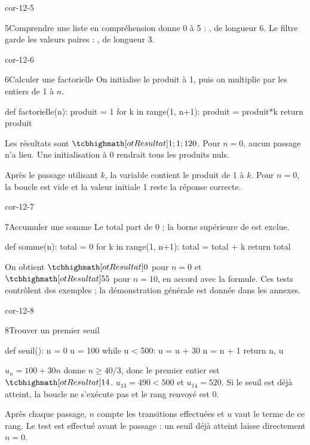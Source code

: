\begin{blocLivre}{cor-12-5}
\begin{corrige}{5}{Comprendre une liste en compréhension}
 donne 0 à 5 : , de longueur 6. Le filtre garde les valeurs paires : , de longueur 3.
\end{corrige}
\end{blocLivre}
\begin{blocLivre}{cor-12-6}
\begin{corrige}{6}{Calculer une factorielle}
On initialise le produit à 1, puis on multiplie par les entiers de 1 à $n$.
\begin{python}
def factorielle(n):
    produit = 1
    for k in range(1, n+1):
        produit = produit*k
    return produit
\end{python}
Les résultats sont $\res{1;1;120}$. Pour $n=0$, aucun passage n'a lieu.
Une initialisation à 0 rendrait tous les produits nuls.

Après le passage utilisant $k$, la variable contient le produit de 1 à $k$. Pour $n=0$, la boucle est vide et la valeur initiale 1 reste la réponse correcte.

\end{corrige}
\end{blocLivre}
\begin{blocLivre}{cor-12-7}
\begin{corrige}{7}{Accumuler une somme}
Le total part de 0 ; la borne supérieure de  est exclue.
\begin{python}
def somme(n):
    total = 0
    for k in range(1, n+1):
        total = total + k
    return total
\end{python}
On obtient $\res{0}$ pour $n=0$ et $\res{55}$ pour $n=10$, en accord avec la formule.
Ces tests contrôlent des exemples ; la démonstration générale est donnée dans les annexes.
\end{corrige}
\end{blocLivre}
\begin{blocLivre}{cor-12-8}
\begin{corrige}{8}{Trouver un premier seuil}
\begin{python}
def seuil():
    n = 0
    u = 100
    while u < 500:
        u = u + 30
        n = n + 1
    return n, u
\end{python}
$u_n=100+30n$ donne $n\geq40/3$, donc le premier entier est $\res{14}$.
$u_{13}=490<500$ et $u_{14}=520$. Si le seuil est déjà atteint, la boucle ne s'exécute pas et le rang renvoyé est 0.

Après chaque passage, $n$ compte les transitions effectuées et $u$ vaut le terme de ce rang. Le test est effectué avant le passage : un seuil déjà atteint laisse directement $n=0$.

\end{corrige}
\end{blocLivre}
